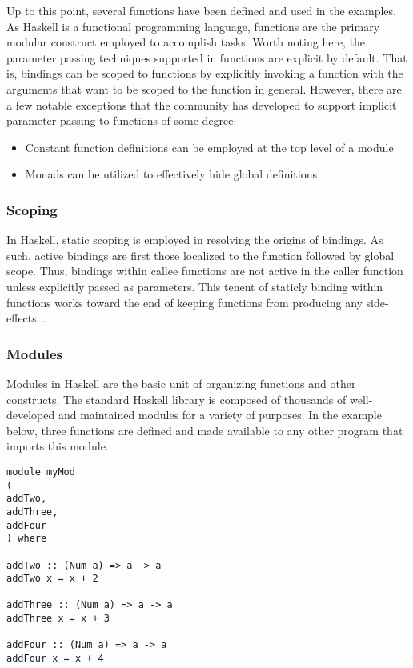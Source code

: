 \documentclass[titlepage,12pt]{article}
\newcommand{\bi}{\begin{itemize}}
\newcommand{\ei}{\end{itemize}}
\begin{document}
Up to this point, several functions have been defined and used in the examples. As Haskell is a functional programming
language, functions are the primary modular construct employed to accomplish tasks. Worth noting here, the parameter passing techniques
supported in functions are explicit by default. That is, bindings can be scoped to functions by explicitly invoking a function
with the arguments that want to be scoped to the function in general. However, there are a few notable exceptions that the community
has developed to support implicit parameter passing to functions of some degree:
\bi
    \item Constant function definitions can be employed at the top level of a module~\cite{haskell-implicit-params}
    \item Monads can be utilized to effectively hide global definitions~\cite{haskell-implicit-params}
\ei

\subsubsection{Scoping}
In Haskell, static scoping is employed in resolving the origins of bindings.  As such, active bindings are first those localized
to the function followed by global scope.  Thus, bindings within callee functions are not active in the caller function
unless explicitly passed as parameters.  This tenent of staticly binding within functions
works toward the end of keeping functions from producing any side-effects~\cite{haskell-scope}.

\subsubsection{Modules}

Modules in Haskell are the basic unit of organizing functions and other constructs.  The standard Haskell library
is composed of thousands of well-developed and maintained modules for a variety of purposes.  In the example below,
three functions are defined and made available to any other program that imports this module.

\begin{verbatim}
module myMod 
( 
addTwo,
addThree,
addFour
) where

addTwo :: (Num a) => a -> a
addTwo x = x + 2

addThree :: (Num a) => a -> a
addThree x = x + 3

addFour :: (Num a) => a -> a
addFour x = x + 4
\end{verbatim}
\end{document}
